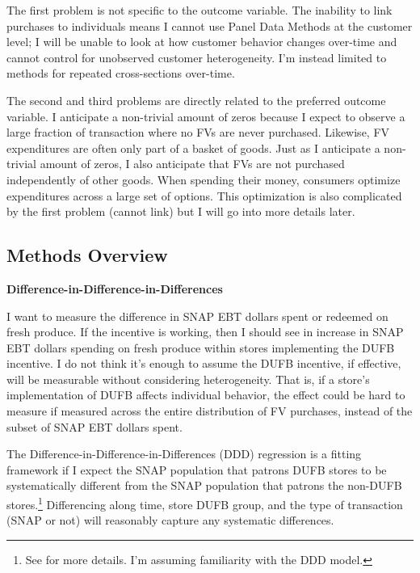 \documentclass[12pt,letterpaperpaper,]{book}
\begin{document}
The first problem is not specific to the outcome variable. The inability
to link purchases to individuals means I cannot use Panel Data Methods
at the customer level; I will be unable to look at how customer behavior
changes over-time and cannot control for unobserved customer
heterogeneity. I'm instead limited to methods for repeated
cross-sections over-time.

The second and third problems are directly related to the preferred
outcome variable. I anticipate a non-trivial amount of zeros because I
expect to observe a large fraction of transaction where no FVs are never
purchased. Likewise, FV expenditures are often only part of a basket of
goods. Just as I anticipate a non-trivial amount of zeros, I also
anticipate that FVs are not purchased independently of other goods. When
spending their money, consumers optimize expenditures across a large set
of options. This optimization is also complicated by the first problem
(cannot link) but I will go into more details later.

\subsection*{Methods Overview}\label{methods-overview}

\textbf{Difference-in-Difference-in-Differences}

I want to measure the difference in SNAP EBT dollars spent or redeemed
on fresh produce. If the incentive is working, then I should see in
increase in SNAP EBT dollars spending on fresh produce within stores
implementing the DUFB incentive. I do not think it's enough to assume
the DUFB incentive, if effective, will be measurable without considering
heterogeneity. That is, if a store's implementation of DUFB affects
individual behavior, the effect could be hard to measure if measured
across the entire distribution of FV purchases, instead of the subset of
SNAP EBT dollars spent.

The Difference-in-Difference-in-Differences (DDD) regression is a
fitting framework if I expect the SNAP population that patrons DUFB
stores to be systematically different from the SNAP population that
patrons the non-DUFB stores.\footnote{See
  \citet{wooldridge_econometric_2010} for more details. I'm assuming
  familiarity with the DDD model.} Differencing along time, store DUFB
group, and the type of transaction (SNAP or not) will reasonably capture
any systematic differences.
\end{document}
